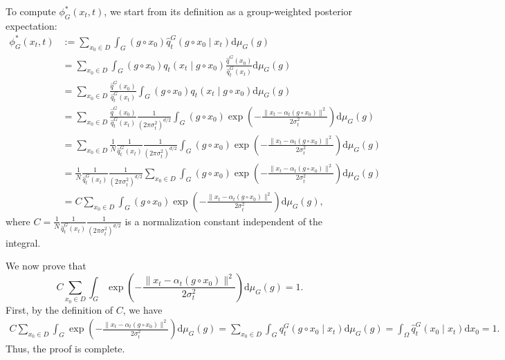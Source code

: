 To compute \( \phi^*_G(x_t, t) \), we start from its definition as a group-weighted posterior expectation:
\begin{align*}
    \phi^*_G(x_t, t) &:= \sum_{x_0 \in D}\int_G (g \circ x_0) \hat{q}^G_t(g \circ x_0 \mid x_t) \mathrm{d}\mu_G(g) \\
    &= \sum_{x_0 \in D} \int_G (g \circ x_0) q_t(x_t \mid g \circ x_0) \frac{\hat{q}^G(x_0)}{\hat{q}^G_t(x_t)} \mathrm{d}\mu_G(g) \\
    &= \sum_{x_0 \in D} \frac{\hat{q}^G(x_0)}{\hat{q}^G_t(x_t)} \int_G (g \circ x_0) q_t(x_t \mid g \circ x_0) \mathrm{d}\mu_G(g) \\
    &= \sum_{x_0 \in D} \frac{\hat{q}^G(x_0)}{\hat{q}^G_t(x_t)} \frac{1}{(2\pi\sigma_t^2)^{d/2}} \int_G (g \circ x_0) \exp\left(-\frac{\| x_t - \alpha_t (g \circ x_0) \|^2}{2\sigma_t^2}\right) \mathrm{d}\mu_G(g) \\
    &= \sum_{x_0 \in D} \frac{1}{N} \frac{1}{\hat{q}^G_t(x_t)} \frac{1}{(2\pi\sigma_t^2)^{d/2}} \int_G (g \circ x_0) \exp\left(-\frac{\| x_t - \alpha_t (g \circ x_0) \|^2}{2\sigma_t^2}\right) \mathrm{d}\mu_G(g) \\
    &= \frac{1}{N} \frac{1}{\hat{q}^G_t(x_t)} \frac{1}{(2\pi\sigma_t^2)^{d/2}}  \sum_{x_0 \in D} \int_G (g \circ x_0) \exp\left(-\frac{\| x_t - \alpha_t (g \circ x_0) \|^2}{2\sigma_t^2}\right) \mathrm{d}\mu_G(g) \\
    &= C  \sum_{x_0 \in D} \int_G (g \circ x_0) \exp\left(-\frac{\| x_t - \alpha_t (g \circ x_0) \|^2}{2\sigma_t^2}\right) \mathrm{d}\mu_G(g) ,
\end{align*}
where \( C = \frac{1}{N} \frac{1}{\hat{q}^G_t(x_t)} \frac{1}{(2\pi\sigma_t^2)^{d/2}} \) is a normalization constant independent of the integral.

We now prove that  
\[
C  \sum_{x_0 \in D} \int_G \exp\left( -\frac{\| x_t - \alpha_t (g \circ x_0) \|^2}{2\sigma_t^2} \right) \mathrm{d}\mu_G(g) = 1.
\]  
First, by the definition of \(C\), we have  
\begin{align*}
    C \sum_{x_0 \in D} \int_G \exp\left( -\frac{\| x_t - \alpha_t (g \circ x_0) \|^2}{2\sigma_t^2} \right) \mathrm{d}\mu_G(g) = \sum_{x_0 \in D} \int_G  q_t^G(g \circ x_0 \mid  x_t ) \mathrm{d}\mu_G(g)
    = \int_\Omega \hat{q}^G_t( x_0 \mid x_t) \mathrm{d}x_0 = 1.
\end{align*}  
Thus, the proof is complete.  


